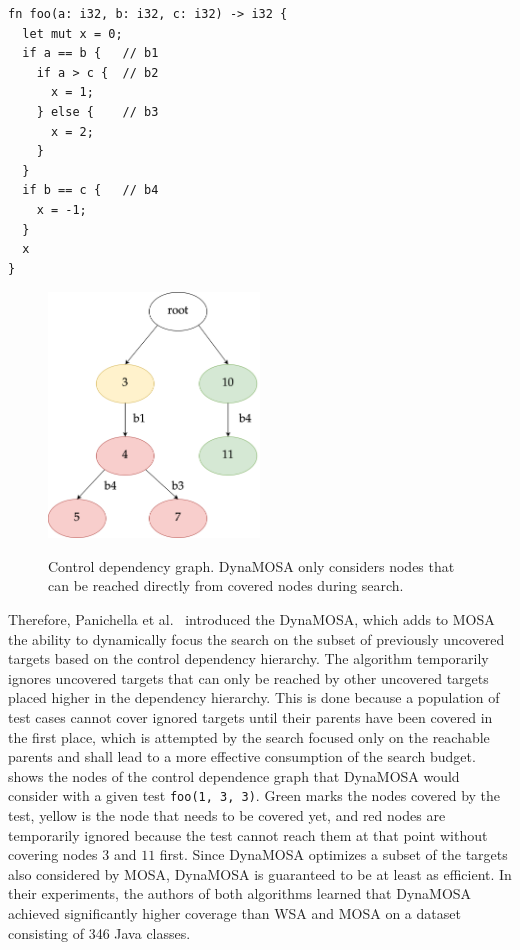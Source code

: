 \documentclass[paper=a4,%
  twoside,%
  BCOR4mm,%
  abstract=true,%
  toc=bibliography,%
  chapterprefix=true,%
  toc=bibliographynumbered,%
  open=right,%
  english,%
  pagesize=pdftex]{scrreprt}
\begin{document}
\begin{lstlisting}[style=boxed, caption={A nested function with control dependent blocks}, label=lst:example-control-dependencies]
fn foo(a: i32, b: i32, c: i32) -> i32 {
  let mut x = 0;
  if a == b {   // b1
    if a > c {  // b2
      x = 1;
    } else {    // b3
      x = 2;
    }
  }
  if b == c {   // b4
    x = -1;
  }
  x
}
\end{lstlisting}

\begin{figure}[h]
\caption{Control dependency graph. DynaMOSA only considers nodes that can be reached directly from covered nodes during search.}
\centering
\includegraphics[width=0.5\textwidth]{cdg-code-example}
\label{fig:example-control-dependencies}
\end{figure}


Therefore, Panichella et al.~\cite{Panichella2018} introduced the \ac{DynaMOSA}, which adds to \ac{MOSA} the ability to dynamically focus the search on the subset of previously uncovered targets based on the control dependency hierarchy. The algorithm temporarily ignores uncovered targets that can only be reached by other uncovered targets placed higher in the dependency hierarchy. This is done because a population of test cases cannot cover ignored targets until their parents have been covered in the first place, which is attempted by the search focused only on the reachable parents and shall lead to a more effective consumption of the search budget.  shows the nodes of the control dependence graph that \ac{DynaMOSA} would consider with a given test \texttt{foo(1, 3, 3)}. Green marks the nodes covered by the test, yellow is the node that needs to be covered yet, and red nodes are temporarily ignored because the test cannot reach them at that point without covering nodes $3$ and $11$ first. Since \ac{DynaMOSA} optimizes a subset of the targets also considered by \ac{MOSA}, \ac{DynaMOSA} is guaranteed to be at least as efficient. In their experiments, the authors of both algorithms learned that \ac{DynaMOSA} achieved significantly higher coverage than \ac{WSA} and \ac{MOSA} on a dataset consisting of 346 Java classes.
\end{document}
